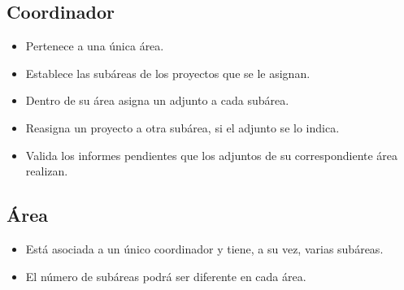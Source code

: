 \documentclass[11pt,a4paper,spanish,twoside]{book}
\begin{document}
\subsection{Coordinador}
\begin{itemize}
\item Pertenece a una única área.
\item Establece las subáreas de los proyectos que se le asignan.
\item Dentro de su área asigna un adjunto a cada subárea.
\item Reasigna un proyecto a otra subárea, si el adjunto se lo indica.
\item Valida los informes pendientes que los adjuntos de su correspondiente 
  área realizan.
\end{itemize}

\subsection{Área}
\begin{itemize}
\item Está asociada a un único coordinador y tiene, a su vez, varias subáreas. 
\item El número de subáreas podrá ser diferente en cada área.
\end{itemize}
\end{document}
